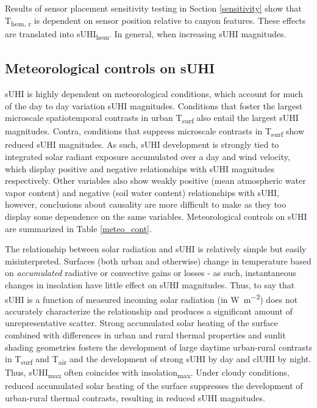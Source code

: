 \begin{bibunit}
Results of sensor placement sensitivity testing in Section \ref{sensitivity} show that T\textsubscript{hem, r} is dependent on sensor position relative to canyon features. These effects are translated into sUHI\textsubscript{hem}. In general, when increasing sUHI magnitudes. 

\subsection{Meteorological controls on sUHI}

sUHI is highly dependent on meteorological conditions, which account for much of the day to day variation sUHI magnitudes. Conditions that foster the largest microscale spatiotemporal contrasts in urban T\textsubscript{surf} also entail the largest sUHI magnitudes. Contra, conditions that suppress microscale contrasts in T\textsubscript{surf} show reduced sUHI magnitudes. As such, sUHI development is strongly tied to integrated solar radiant exposure accumulated over a day and wind velocity, which display positive and negative relationships with sUHI magnitudes respectively. Other variables also show weakly positive (mean atmospheric water vapor content) and negative (soil water content) relationships with sUHI, however, conclusions about causality are more difficult to make as they too display some dependence on the same variables. Meteorological controls on sUHI are summarized in Table \ref{meteo_cont}.

The relationship between solar radiation and sUHI is relatively simple but easily misinterpreted. Surfaces (both urban and otherwise) change in temperature based on \textit{accumulated} radiative or convective gains or losses - as such, instantaneous changes in insolation have little effect on sUHI magnitudes. Thus, to say that sUHI is a function of measured incoming solar radiation (in \si{\watt\per\square\meter}) does not accurately characterize the relationship and produces a significant amount of unrepresentative scatter. Strong accumulated solar heating of the surface combined with differences in urban and rural thermal properties and sunlit shading geometries fosters the development of large daytime urban-rural contrasts in T\textsubscript{surf} and T\textsubscript{air} and the development of strong sUHI by day and clUHI by night. Thus, sUHI\textsubscript{max} often coincides with insolation\textsubscript{max}. Under cloudy conditions, reduced accumulated solar heating of the surface suppresses the development of urban-rural thermal contrasts, resulting in reduced sUHI magnitudes. 


\end{bibunit}
